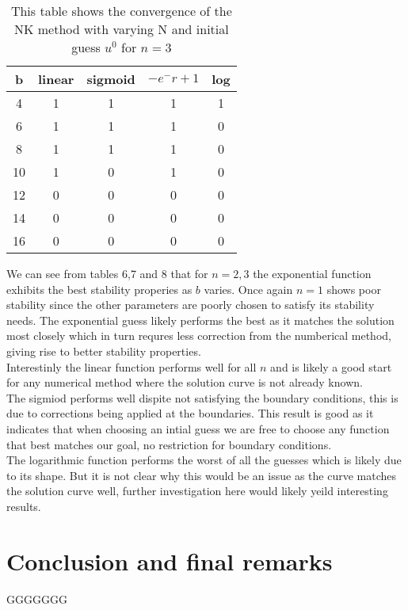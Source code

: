 \documentclass{article}
\begin{document}
\begin{table}[H]
\centering
\begin{tabular}{|c|c|c|c|c|}
\hline
b                                          & linear  & sigmoid & $-e^-r + 1$ &log \\
\hline
4                                          & 1 & 1 & 1 & 1\\
6                                          & 1 & 1 & 1 & 0\\
8                                          & 1 & 1 & 1 & 0\\
10                                         & 1 & 0 & 1 & 0\\
12                                         & 0 & 0 & 0 & 0\\
14                                         & 0 & 0 & 0 & 0\\
16                                         & 0 & 0 & 0 & 0\\
\hline
\end{tabular}
\caption{This table shows the convergence of the NK method with varying N and initial guess $u^0$ for $n=3$}
\end{table}
We can see from tables 6,7 and 8 that for $n=2,3$ the exponential function exhibits the best stability properies as $b$ varies. Once again $n=1$ shows poor stability since the other parameters are poorly chosen to satisfy its stability needs. The exponential guess likely performs the best as it matches the solution most closely which in turn requres less correction from the numberical method, giving rise to better stability properties. \\
Interestinly the linear function performs well for all $n$ and is likely a good start for any numerical method where the solution curve is not already known. \\
The sigmiod performs well dispite not satisfying the boundary conditions, this is due to corrections being applied at the boundaries. This result is good as it indicates that when choosing an intial guess we are free to choose any function that best matches our goal, no restriction for boundary conditions. \\
The logarithmic function performs the worst of all the guesses which is likely due to its shape. But it is not clear why this would be an issue as the curve matches the solution curve well, further investigation here would likely yeild interesting results. \\
\section{Conclusion and final remarks}
GGGGGGG
\end{document}
